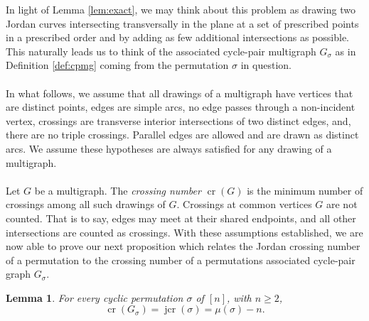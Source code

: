 \documentclass[11pt,a4paper]{amsart}
\newtheorem{lemma}[theorem]{Lemma}
\theoremstyle{definition}
\theoremstyle{remark}
\DeclareMathOperator{\crn}{cr}
\DeclareMathOperator{\jcr}{jcr}
\begin{document}
In light of Lemma \ref{lem:exact}, we may think about this problem as drawing two Jordan curves intersecting transversally in the plane at a set of prescribed points in a prescribed order and by adding as few additional intersections as possible.  This naturally leads us to think of the associated cycle-pair multigraph $G_{\sigma}$ as in Definition \ref{def:cpmg} coming from the permutation $\sigma$ in question.   \\
\\
In what follows, we assume that all drawings of a multigraph have vertices that are distinct points, edges are simple arcs, no edge passes through a non-incident vertex, crossings are transverse interior intersections of two distinct edges, and, there are no triple crossings.  Parallel edges are allowed and are drawn as distinct arcs.  We assume these hypotheses are always satisfied for any drawing of a multigraph.   \\
\\
Let $G$ be a multigraph.  The \emph{crossing number} $\crn(G)$ is the minimum number of crossings among all such drawings of $G$.  Crossings at common vertices $G$ are not counted. That is to say, edges may meet at their shared endpoints, and all other intersections are counted as crossings.  With these assumptions established, we are now able to prove our next proposition which relates the Jordan crossing number of a permutation to the crossing number of a permutations associated cycle-pair graph $G_{\sigma}$.  

\begin{lemma}\label{lem:cr-lower}
For every cyclic permutation $\sigma$ of $[n]$, with $n\ge 2$,
\begin{equation*}
        \crn(G_{\sigma}) = \jcr(\sigma)=\mu(\sigma)-n.
\end{equation*}
\end{lemma}
\end{document}
